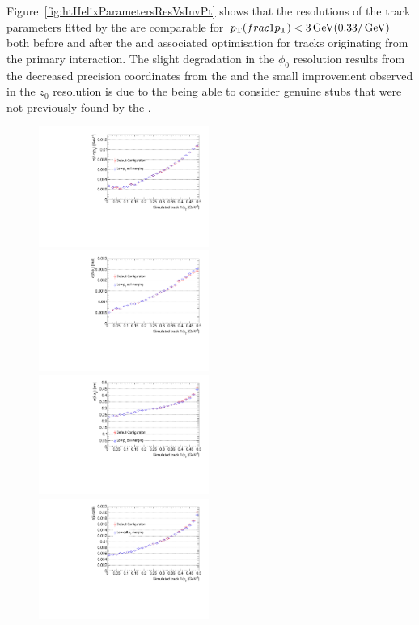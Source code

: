 Figure~\ref{fig:htHelixParametersResVsInvPt} shows that the resolutions of the track parameters fitted by the \KF are comparable for $p_{\mathrm{T}} (frac{1}{p_{\mathrm{T}}})  < 3\,\text{Ge\hspace{-.08em}V} (0.33/\,\text{Ge\hspace{-.08em}V})$ both before and after the \HT and associated \KF optimisation for tracks originating from the primary interaction.
The slight degradation in the $\phi_{0}$ resolution results from the decreased precision coordinates from the \HT and the small improvement observed in the $z_{0}$ resolution is due to the \KF being able to consider genuine stubs that were not previously found by the \HT.

\begin{figure}[htb]
\centering
\includegraphics[width=0.495\textwidth]{figs/tk-upgrade/results-lowPtTracking/qOverPtResVsInvPtFlatGeometry_5000.pdf}
\includegraphics[width=0.495\textwidth]{figs/tk-upgrade/results-lowPtTracking/phi0ResVsInvPtFlatGeometry_5000.pdf}
\\
\includegraphics[width=0.495\textwidth]{figs/tk-upgrade/results-lowPtTracking/z0ResVsInvPtFlatGeometry_5000.pdf}
\includegraphics[width=0.495\textwidth]{figs/tk-upgrade/results-lowPtTracking/cotThetaResVsInvPtFlatGeometry_5000.pdf}

\end{figure}
